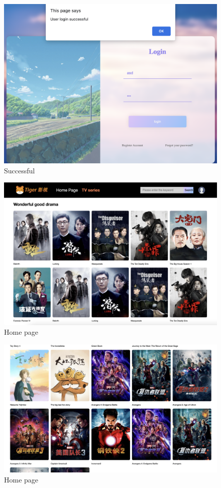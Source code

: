 \documentclass[a4paper, 11pt]{report}
\begin{document}
\begin{figure}
\includegraphics[width=1\linewidth]{login2.png}
\caption{\label{login2.png}Successful}
\end{figure}

\begin{figure}
\includegraphics[width=1\linewidth]{hp.png}
\caption{\label{hp.png}Home page}
\end{figure}

\begin{figure}
\includegraphics[width=1\linewidth]{hp1.png}
\caption{\label{hp1.png}Home page}
\end{figure}
\end{document}
